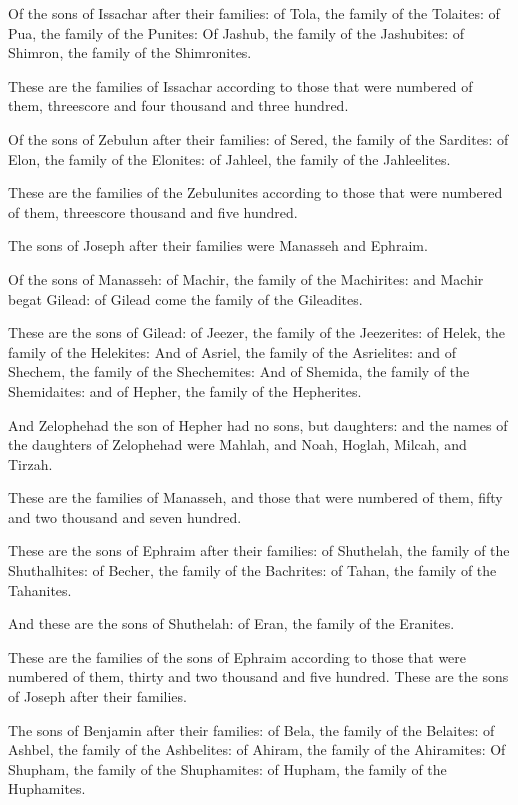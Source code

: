 \Verse Of the sons of Issachar after their families: of Tola, the
family of the Tolaites: of Pua, the family of the Punites: \Verse Of
Jashub, the family of the Jashubites: of Shimron, the family of the
Shimronites.

\Verse These are the families of Issachar according to those that were
numbered of them, threescore and four thousand and three hundred.

\Verse Of the sons of Zebulun after their families: of Sered, the
family of the Sardites: of Elon, the family of the Elonites: of
Jahleel, the family of the Jahleelites.

\Verse These are the families of the Zebulunites according to those
that were numbered of them, threescore thousand and five hundred.

\Verse The sons of Joseph after their families were Manasseh and
Ephraim.

\Verse Of the sons of Manasseh: of Machir, the family of the
Machirites: and Machir begat Gilead: of Gilead come the family of the
Gileadites.

\Verse These are the sons of Gilead: of Jeezer, the family of the
Jeezerites: of Helek, the family of the Helekites: \Verse And of
Asriel, the family of the Asrielites: and of Shechem, the family of
the Shechemites: \Verse And of Shemida, the family of the Shemidaites:
and of Hepher, the family of the Hepherites.

\Verse And Zelophehad the son of Hepher had no sons, but daughters: and
the names of the daughters of Zelophehad were Mahlah, and Noah,
Hoglah, Milcah, and Tirzah.

\Verse These are the families of Manasseh, and those that were numbered
of them, fifty and two thousand and seven hundred.

\Verse These are the sons of Ephraim after their families: of
Shuthelah, the family of the Shuthalhites: of Becher, the family of
the Bachrites: of Tahan, the family of the Tahanites.

\Verse And these are the sons of Shuthelah: of Eran, the family of the
Eranites.

\Verse These are the families of the sons of Ephraim according to those
that were numbered of them, thirty and two thousand and five hundred.
These are the sons of Joseph after their families.

\Verse The sons of Benjamin after their families: of Bela, the family
of the Belaites: of Ashbel, the family of the Ashbelites: of Ahiram,
the family of the Ahiramites: \Verse Of Shupham, the family of the
Shuphamites: of Hupham, the family of the Huphamites.

